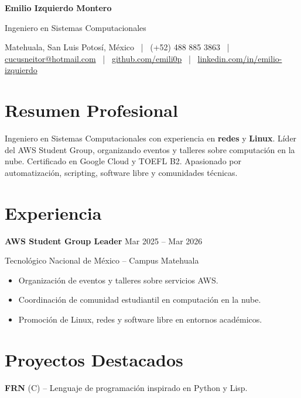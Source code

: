\documentclass[10pt,letterpaper]{article}
\begin{document}
\begin{center}
{\Large\textbf{Emilio Izquierdo Montero}}  

\vspace{0.1cm}

{\normalsize Ingeniero en Sistemas Computacionales}

\vspace{0.1cm}

{\footnotesize  
Matehuala, San Luis Potosí, México \, | \,
(+52) 488 885 3863 \, | \,
\href{mailto:cucusneitor@hotmail.com}{cucusneitor@hotmail.com} \, | \,
\href{https://github.com/emili0p}{github.com/emili0p} \, | \,
\href{https://linkedin.com/in/emilio-izquierdo-91b16933a}{linkedin.com/in/emilio-izquierdo}
}
\end{center}

\vspace{-0.2cm}  

\section{Resumen Profesional}
\noindent
Ingeniero en Sistemas Computacionales con experiencia en \textbf{redes} y \textbf{Linux}. 
Líder del AWS Student Group, organizando eventos y talleres sobre computación en la nube. 
Certificado en Google Cloud y TOEFL B2. Apasionado por automatización, scripting, software libre y comunidades técnicas.

\section{Experiencia}
\noindent
\textbf{AWS Student Group Leader} \hfill Mar 2025 -- Mar 2026

\noindent
Tecnológico Nacional de México -- Campus Matehuala

\begin{itemize}
\item Organización de eventos y talleres sobre servicios AWS.
\item Coordinación de comunidad estudiantil en computación en la nube.
\item Promoción de Linux, redes y software libre en entornos académicos.
\end{itemize}

\section{Proyectos Destacados}
\noindent
\textbf{FRN} (C) -- Lenguaje de programación inspirado en Python y Lisp.
\end{document}
